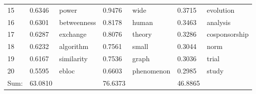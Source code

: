 \documentclass[hyperref={pdfstartview={FitBH -32768},
                         pdfpagemode=FullScreen,
                         plainpages=false,
                         colorlinks=true}
              ]{beamer}
\begin{document}
\begin{frame}[fragile]
\begin{center}
\begin{tabular}{p{0.5cm}|p{0.8cm}|p{1.7cm}||p{0.8cm}|p{1.4cm}||p{0.8cm}|p{1.6cm}}
        15 	&  0.6346  & power	    &	    0.9476  & wide	       &	  0.3715 &  evolution	    \\
        16 	&  0.6301  & betweenness    &	    0.8178  & human	       &	  0.3463 &  analysis	    \\
        17 	&  0.6287  & exchange	    &	    0.8076  & theory	       &	  0.3286 &  cosponsorship   \\
        18 	&  0.6232  & algorithm	    &	    0.7561  & small	       &	  0.3044 &  norm	    \\
        19 	&  0.6167  & similarity	    &	    0.7536  & graph	       &	  0.3036 &  trial	    \\
        20 	&  0.5595  & ebloc	    &	    0.6603  & phenomenon       &	  0.2985 &  study	    \\ \hline
     Sum: & 63.0810	& 		  &   76.6373		& 		&  46.8865	  & 		    \\  \hline\hline
\end{tabular}
\end{center}

\end{frame}
    
\end{document}
